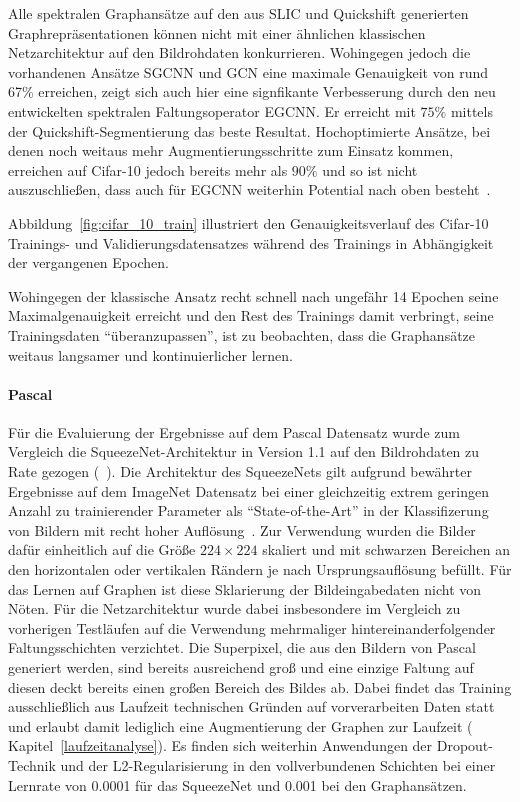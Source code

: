 Alle spektralen Graphansätze auf den aus \gls{SLIC} und Quickshift generierten Graphrepräsentationen können nicht mit einer ähnlichen klassischen Netzarchitektur auf den Bildrohdaten konkurrieren.
Wohingegen jedoch die vorhandenen Ansätze \acs{SGCNN} und \acs{GCN} eine maximale Genauigkeit von rund 67\% erreichen, zeigt sich auch hier eine signfikante Verbesserung durch den neu entwickelten spektralen Faltungsoperator \acs{EGCNN}.
Er erreicht mit $75\%$ mittels der Quickshift-Segmentierung das beste Resultat.
Hochoptimierte Ansätze, bei denen noch weitaus mehr Augmentierungsschritte zum Einsatz kommen, erreichen auf \gls{Cifar}-10 jedoch bereits mehr als $90\%$ und so ist nicht auszuschließen, dass auch für \acs{EGCNN} weiterhin Potential nach oben besteht~\cite{fracmaxpool}.

Abbildung~\ref{fig:cifar_10_train} illustriert den Genauigkeitsverlauf des \gls{Cifar}-10 Trainings- und Validierungsdatensatzes während des Trainings in Abhängigkeit der vergangenen Epochen.

Wohingegen der klassische Ansatz recht schnell nach ungefähr 14 Epochen seine Maximalgenauigkeit erreicht und den Rest des Trainings damit verbringt, seine Trainingsdaten \enquote{überanzupassen}, ist zu beobachten, dass die Graphansätze weitaus langsamer und kontinuierlicher lernen.

\paragraph{\gls{Pascal}}

Für die Evaluierung der Ergebnisse auf dem \gls{Pascal} Datensatz wurde zum Vergleich die SqueezeNet-Architektur in Version 1.1 auf den Bildrohdaten zu Rate gezogen (\vgl{}~\cite{squeeze}).
Die Architektur des SqueezeNets gilt aufgrund bewährter Ergebnisse auf dem ImageNet Datensatz bei einer gleichzeitig extrem geringen Anzahl zu trainierender Parameter als \enquote{State-of-the-Art} in der Klassifizerung von Bildern mit recht hoher Auflösung~\cite{squeeze}.
Zur Verwendung wurden die Bilder dafür einheitlich auf die Größe $224 \times 224$ skaliert und mit schwarzen Bereichen an den horizontalen oder vertikalen Rändern je nach Ursprungsauflösung befüllt.
Für das Lernen auf Graphen ist diese Sklarierung der Bildeingabedaten nicht von Nöten.
Für die Netzarchitektur wurde dabei insbesondere im Vergleich zu vorherigen Testläufen auf die Verwendung mehrmaliger hintereinanderfolgender Faltungsschichten verzichtet.
Die Superpixel, die aus den Bildern von \gls{Pascal} generiert werden, sind bereits ausreichend groß und eine einzige Faltung auf diesen deckt bereits einen großen Bereich des Bildes ab.
Dabei findet das Training ausschließlich aus Laufzeit technischen Gründen auf vorverarbeiten Daten statt und erlaubt damit lediglich eine Augmentierung der Graphen zur Laufzeit (\vgl{} Kapitel~\ref{laufzeitanalyse}).
Es finden sich weiterhin Anwendungen der Dropout-Technik und der L2-Regularisierung in den vollverbundenen Schichten bei einer Lernrate von 0.0001 für das SqueezeNet und 0.001 bei den Graphansätzen.

